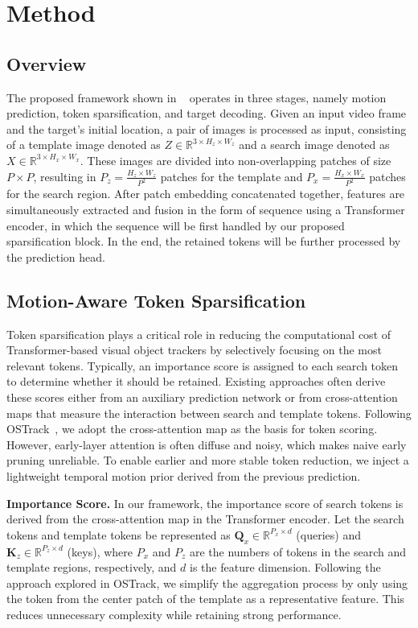 \section{Method}
\label{Method}

\subsection{Overview}
The proposed framework shown in ~ operates in three stages, namely motion prediction, token sparsification, and target decoding. Given an input video frame and the target's initial location, a pair of images is processed as input, consisting of a template image denoted as $Z \in \mathbb{R}^{3 \times H_{z} \times W_{z}}$ and a search image denoted as $X \in \mathbb{R}^{3 \times H_{x} \times W_{x}}$. These images are divided into non-overlapping patches of size $P \times P$, resulting in $P_{z} = \frac{H_{z} \times W_{z}}{P^2}$ patches for the template and $P_{x} = \frac{H_{x} \times W_{x}}{P^2}$ patches for the search region. After patch embedding concatenated together, features are simultaneously extracted and fusion in the form of sequence using a Transformer encoder, in which the sequence will be first handled by our proposed sparsification block. In the end, the retained tokens will be further processed by the prediction head.



\subsection{Motion-Aware Token Sparsification}
Token sparsification plays a critical role in reducing the computational cost of Transformer-based visual object trackers by selectively focusing on the most relevant tokens. Typically, an importance score is assigned to each search token to determine whether it should be retained. Existing approaches often derive these scores either from an auxiliary prediction network or from cross-attention maps that measure the interaction between search and template tokens. Following OSTrack~\cite{ostrack}, we adopt the cross-attention map as the basis for token scoring. However, early-layer attention is often diffuse and noisy, which makes naive early pruning unreliable. To enable earlier and more stable token reduction, we inject a lightweight temporal motion prior derived from the previous prediction.

\textbf{Importance Score.} In our framework, the importance score of search tokens is derived from the cross-attention map in the Transformer encoder. Let the search tokens and template tokens be represented as $\mathbf{Q}_x \in \mathbb{R}^{P_x \times d}$ (queries) and $\mathbf{K}_z \in \mathbb{R}^{P_z \times d}$ (keys), where $P_x$ and $P_z$ are the numbers of tokens in the search and template regions, respectively, and $d$ is the feature dimension. Following the approach explored in OSTrack, we simplify the aggregation process by only using the token from the center patch of the template as a representative feature. This reduces unnecessary complexity while retaining strong performance.

